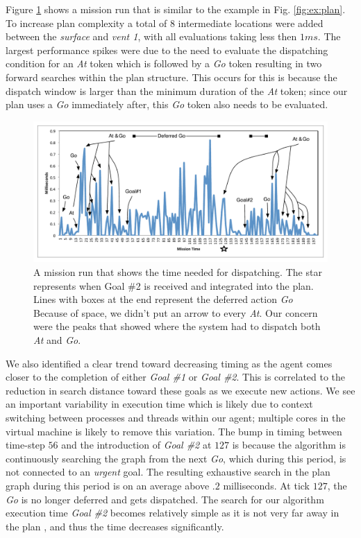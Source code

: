 Figure \ref{fig:example_run} shows a mission run that is similar to
the example in Fig. \ref{fig:ex:plan}.  To increase plan complexity a
total of $8$ intermediate locations were added between the {\em
  surface} and {\em vent 1}, with all evaluations taking less then
$1ms$. The largest performance spikes were due to the need to evaluate
the dispatching condition for an {\em At} token which is followed by a
{\em Go} token resulting in two forward searches within the plan
structure. This occurs for this is because the dispatch window is
larger than the minimum duration of the {\em At} token; since our plan
uses a {\em Go} immediately after, this \emph{Go} token also needs to
be evaluated.

\begin{figure}[t]
  \centering
  \includegraphics[width=1.2\columnwidth]{figs/example_run.pdf}
  \caption{\small A mission run that shows the time needed for
    dispatching. The star represents when Goal \#2 is received and
    integrated into the plan. Lines with boxes at the end represent
    the deferred action {\em Go} Because of space, we didn't put an
    arrow to every {\em At}. Our concern were the peaks that showed
    where the system had to dispatch both {\em At} and {\em Go}. }
  \label{fig:example_run}
\end{figure}


We also identified a clear trend toward decreasing timing as the agent
comes closer to the completion of either {\em Goal \#1} or {\em Goal
  \#2}. This is correlated to the reduction in search distance toward
these goals as we execute new actions.  We see an important
variability in execution time which is likely due to context switching
between processes and threads within our agent; multiple cores in the
virtual machine is likely to remove this variation.  The bump in
timing between time-step $56$ and the introduction of {\em Goal \#2}
at $127$ is because the algorithm is continuously searching the graph
from the next {\em Go}, which during this period, is not connected to
an {\em urgent} goal. The resulting exhaustive search in the plan
graph during this period is on an average above $.2$ milliseconds. At
tick $127$, the {\em Go} is no longer deferred and gets dispatched.
The search for our algorithm execution time {\em Goal \#2} becomes
relatively simple as it is not very far away in the plan
, and thus the time
decreases significantly.

